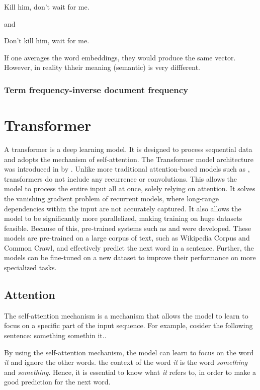 Kill him, don't wait for me.

and

Don't kill him, wait for me.

If one averages the word embeddings, they would  produce the same vector. However,  in reality thheir meaning  (semantic) is very  diffferent.

\subsubsection{Term frequency-inverse document frequency}
\label{sec:tf-idf}

\section{Transformer}
\label{sec:transformer}
A transformer is a deep learning model. It is designed to process sequential data and adopts the mechanism of self-attention. The Transformer model architecture was introduced in \citeyear{vaswani2017attention} by \textcite{vaswani2017attention}. Unlike more traditional attention-based models such as , transformers do not include any recurrence or convolutions. This allows the model to process the entire input all at once, solely relying on attention. It solves the vanishing gradient problem of recurrent models, where long-range dependencies within the input are not accurately captured. It also allows the model to be significantly more parallelized, making training on huge datasets feasible. Because of this, pre-trained systems such as  and  were developed. These models are pre-trained on a large corpus of text, such as Wikipedia Corpus and Common Crawl, and effectively predict the next word in a sentence. Further, the models can be fine-tuned on a new dataset to improve their performance on more specialized tasks.

\subsection{Attention}
The self-attention mechanism is a mechanism that allows the model to learn to focus on a specific part of the input sequence. For example, cosider the following sentence: 
something somethin it..

By using the self-attention mechanism, the model can learn to focus on the word \textit{it} and ignore the other words. the context of the word \textit{it} is the word \textit{something} and \textit{something}. Hence, it is essential to know what \textit{it} refers to, in order to make a good prediction for the next word.

